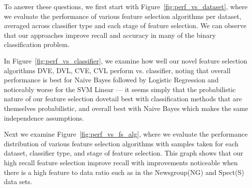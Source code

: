 To answer these questions, we first start with
Figure~\ref{fig:perf_vs_dataset}, where we evaluate the performance of
various feature selection algorithms per dataset, averaged across
classifier type and each stage of feature selection. We can observe that our approaches improve recall and accuracy in many of the binary classification problem.

In Figure~\ref{fig:perf_vs_classifier}, we examine how well our 
novel feature selection algorithms DVE, DVL, CVE, CVL 
perform vs. classifier, noting that overall performance is best
for Naive Bayes followed by Logistic Regression and noticeably worse for
the SVM Linear --- it seems simply that the probabilistic nature of our feature selection
dovetail best with classification methods that are themselves probabilistic,
and overall best with Naive Bayes which makes the same independence assumptions.

Next we examine Figure~\ref{fig:perf_vs_fs_alg}, where we evaluate the
performance distribution of various feature selection algorithms with
samples taken for each dataset, classifier type, and stage of feature
selection. This graph shows that our high recall feature selection improve recall with improvements noticeable when there is a high feature to data ratio such as in the Newsgroup(NG) and Spect(S) data sets.

